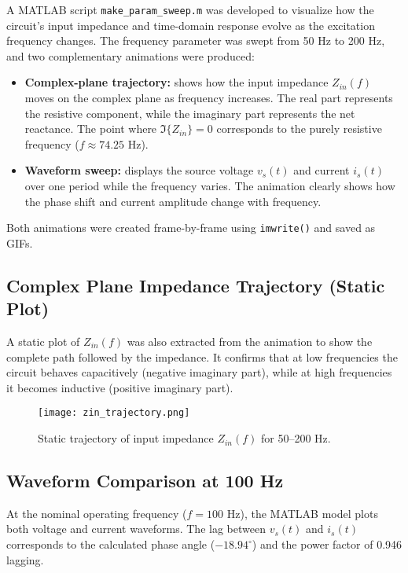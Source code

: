 \documentclass{article}
\begin{document}
A MATLAB script \texttt{make\_param\_sweep.m} was developed to visualize how the circuit’s input impedance 
and time-domain response evolve as the excitation frequency changes.
The frequency parameter was swept from 50 Hz to 200 Hz, and two complementary animations were produced:

\begin{itemize}
  \item \textbf{Complex-plane trajectory:} shows how the input impedance $Z_{in}(f)$ moves on the complex plane 
  as frequency increases. The real part represents the resistive component, while the imaginary part represents 
  the net reactance. The point where $\Im\{Z_{in}\}=0$ corresponds to the purely resistive frequency 
  ($f \approx 74.25$ Hz).
  \item \textbf{Waveform sweep:} displays the source voltage $v_s(t)$ and current $i_s(t)$ over one period 
  while the frequency varies. The animation clearly shows how the phase shift and current amplitude 
  change with frequency.
\end{itemize}

\noindent
Both animations were created frame-by-frame using \texttt{imwrite()} and saved as GIFs.


\subsection{Complex Plane Impedance Trajectory (Static Plot)}

A static plot of $Z_{in}(f)$ was also extracted from the animation to show the complete path followed by the impedance.
It confirms that at low frequencies the circuit behaves capacitively (negative imaginary part),
while at high frequencies it becomes inductive (positive imaginary part).

\begin{figure}[H]
  \centering
  \texttt{[image: zin\_trajectory.png]}
  \caption{Static trajectory of input impedance $Z_{in}(f)$ for 50--200 Hz.}
\end{figure}

\subsection{Waveform Comparison at 100 Hz}

At the nominal operating frequency ($f=100$ Hz), the MATLAB model plots both voltage and current waveforms.
The lag between $v_s(t)$ and $i_s(t)$ corresponds to the calculated phase angle ($-18.94^{\circ}$)
and the power factor of 0.946 lagging.
\end{document}

